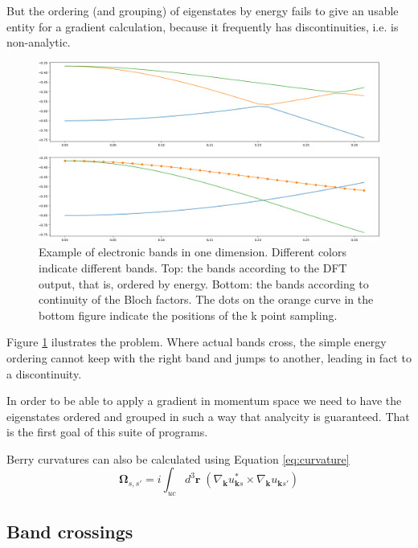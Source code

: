 \documentclass[a4paper,12pt]{report}
\begin{document}
But the ordering (and grouping) of eigenstates by energy fails to give an usable entity for a gradient calculation,
because it frequently has discontinuities, i.e. is non-analytic.
\begin{figure}
 \centering
 \includegraphics[scale=0.3,keepaspectratio=true]{figures/order_bands1D.png}
 \caption{Example of electronic bands in one dimension.
 Different colors indicate different bands.
 Top: the bands according to the DFT output, that is, ordered by energy.
 Bottom: the bands according to continuity of the Bloch factors.
 The dots on the orange curve in the bottom figure indicate the positions of the k point sampling.}
 \label{fig:orderbands}
\end{figure}
Figure \ref{fig:orderbands} ilustrates the problem.
Where actual bands cross, the simple energy ordering cannot keep with the right band and jumps to another,
leading in fact to a discontinuity.

In order to be able to apply a gradient in momentum space we need to have the eigenstates ordered and grouped
in such a way that analycity is guaranteed.
That is the first goal of this suite of programs.

Berry curvatures can also be calculated using Equation \ref{eq:curvature} \cite{Gradhand_2012}
\begin{equation}\label{eq:curvature}
 \pmb{\Omega}_{s,s'} = i\int_{uc}d^3\pmb{r}\;(\nabla_{\pmb{k}}u_{\pmb{k}s}^* \times \nabla_{\pmb{k}} u_{\pmb{k}s'})
\end{equation}

\subsection*{Band crossings}\label{ssec:bandcrossings}
\end{document}
